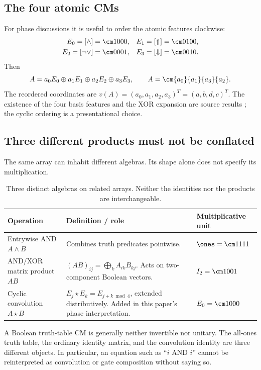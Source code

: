 \subsection{The four atomic CMs}
For phase discussions it is useful to order the atomic features clockwise:
\begin{align}
 E_0=[\land]&=\cm1000,& E_1=[\Uparrow]&=\cm0100,\\
 E_2=[\neg\lor]&=\cm0001,& E_3=[\Downarrow]&=\cm0010.
\end{align}
Then
\begin{equation}
 A=a_0E_0\oplus a_1E_1\oplus a_2E_2\oplus a_3E_3,
 \qquad A=\cm{a_0}{a_1}{a_3}{a_2}.
\end{equation}
The reordered coordinates are $v(A)=(a_0,a_1,a_2,a_3)^T=(a,b,d,c)^T$. The existence of the four basis features and the XOR expansion are source results \cite[Figure 1 and Section 3.2.1]{droncheff}; the cyclic ordering is a presentational choice.

\subsection{Three different products must not be conflated}
The same array can inhabit different algebras. Its shape alone does not specify its multiplication.
\begin{table}[htbp]
\centering\small
\begin{tabularx}{\textwidth}{@{}L{0.26\textwidth}Y L{0.21\textwidth}@{}}
\toprule
Operation & Definition / role & Multiplicative unit\\
\midrule
Entrywise AND $A\land B$ & Combines truth predicates pointwise. & $\ones=\cm1111$\\
AND/XOR matrix product $AB$ & $(AB)_{ij}=\bigoplus_k A_{ik}B_{kj}$. Acts on two-component Boolean vectors. & $I_2=\cm1001$\\
Cyclic convolution $A\star B$ & $E_j\star E_k=E_{j+k\bmod4}$, extended distributively. Added in this paper's phase interpretation. & $E_0=\cm1000$\\
\bottomrule
\end{tabularx}
\caption{Three distinct algebras on related arrays. Neither the identities nor the products are interchangeable.}
\end{table}
A Boolean truth-table CM is generally neither invertible nor unitary. The all-ones truth table, the ordinary identity matrix, and the convolution identity are three different objects. In particular, an equation such as ``$i$ AND $i$'' cannot be reinterpreted as convolution or gate composition without saying so.

